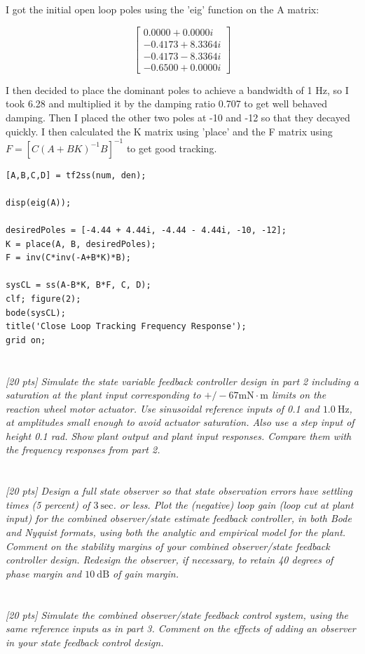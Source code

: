 \documentclass{article}
\begin{document}
I got the initial open loop poles using the 'eig' function on the A matrix:

\[
\begin{bmatrix}
0.0000 + 0.0000i \\
-0.4173 + 8.3364i \\
-0.4173 - 8.3364i \\
-0.6500 + 0.0000i
\end{bmatrix}
\]

I then decided to place the dominant poles to achieve a bandwidth of 1 Hz, so I took 6.28 and multiplied it by the damping ratio 0.707 to get well behaved damping.
Then I placed the other two poles at -10 and -12 so that they decayed quickly.
I then calculated the K matrix using 'place' and the F matrix using $F = \left[ C (A + B K)^{-1} B \right]^{-1}$ to get good tracking.

\begin{lstlisting}[style=matlabstyle]
[A,B,C,D] = tf2ss(num, den);

disp(eig(A));

desiredPoles = [-4.44 + 4.44i, -4.44 - 4.44i, -10, -12];
K = place(A, B, desiredPoles);
F = inv(C*inv(-A+B*K)*B);

sysCL = ss(A-B*K, B*F, C, D);
clf; figure(2);
bode(sysCL);
title('Close Loop Tracking Frequency Response');
grid on;    
\end{lstlisting}

\section{}
\textit{[20 pts] Simulate the state variable feedback controller design in part 2 including a saturation at the plant input corresponding to $+/-67 \mathrm{mN} \cdot \mathrm{m}$ limits on the reaction wheel motor actuator. Use sinusoidal reference inputs of 0.1 and $1.0 \mathrm{~Hz}$, at amplitudes small enough to avoid actuator saturation. Also use a step input of height 0.1 rad. Show plant output and plant input responses. Compare them with the frequency responses from part 2.}

\section{}
\textit{[20 pts] Design a full state observer so that state observation errors have settling times (5 percent) of $3 \mathrm{~sec}$. or less. Plot the (negative) loop gain (loop cut at plant input) for the combined observer/state estimate feedback controller, in both Bode and Nyquist formats, using both the analytic and empirical model for the plant. Comment on the stability margins of your combined observer/state feedback controller design. Redesign the observer, if necessary, to retain 40 degrees of phase margin and $10 \mathrm{~dB}$ of gain margin.}

\section{}
\textit{[20 pts] Simulate the combined observer/state feedback control system, using the same reference inputs as in part 3. Comment on the effects of adding an observer in your state feedback control design.}
\end{document}
